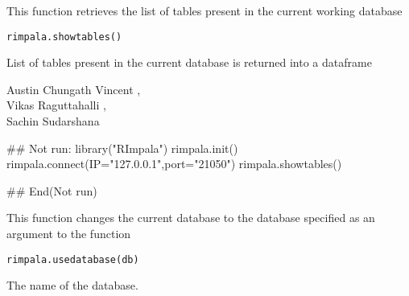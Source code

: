 \documentclass[letterpaper]{book}
\begin{document}
%
\begin{Description}\relax
This function retrieves the list of tables present in the current working database
\end{Description}
%
\begin{Usage}
\begin{verbatim}
rimpala.showtables()
\end{verbatim}
\end{Usage}
%
\begin{Value}
List of tables present in the current database is returned into a dataframe
\end{Value}
%
\begin{Author}\relax
Austin Chungath Vincent ,\\{}
Vikas Raguttahalli ,\\{}
Sachin Sudarshana 
\end{Author}
%
\begin{Examples}
\begin{ExampleCode}
## Not run: 
library("RImpala")
rimpala.init()
rimpala.connect(IP="127.0.0.1",port="21050")
rimpala.showtables()

## End(Not run)
\end{ExampleCode}
\end{Examples}
%
\begin{Description}\relax
This function changes the current database to the database specified as an argument to the function
\end{Description}
%
\begin{Usage}
\begin{verbatim}
rimpala.usedatabase(db)
\end{verbatim}
\end{Usage}
%
\begin{Arguments}
\begin{ldescription}
\item[\code{db}] 
The name of the database.

\end{ldescription}
\end{Arguments}
\end{document}
